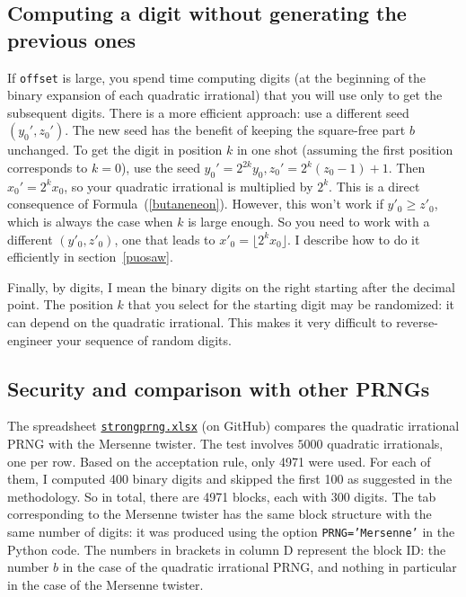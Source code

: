 \documentclass[oneside,10pt]{book}
\begin{document}
\subsection{Computing a digit without generating the previous ones}\label{imprsqrt2mnb}

If \texttt{offset} is large, you spend time computing digits (at the beginning of the binary expansion of each quadratic irrational) that you will use only   to get the subsequent digits.
 There is a more efficient approach: use a different seed $(y_0', z_0')$. The new seed has the benefit of keeping
 the square-free part $b$ unchanged. To get the digit in position $k$ in one shot (assuming the first position corresponds to $k=0$), use the
 seed $y_0'=2^{2k} y_0, z_0'=2^k(z_0-1) + 1$. Then $x_0' = 2^k x_0$, so your quadratic irrational is multiplied by $2^k$. This is a direct consequence
of Formula~(\ref{butaneneon}). However, this won't work if $y'_0 \geq z'_0$, which is always the case when $k$ is large enough.
So you need to work with a different $(y'_0, z'_0)$, one that leads to $x'_0 = \lfloor 2^k x_0 \rfloor$. I describe how to do it efficiently
in section~\ref{puosaw}.

Finally, by digits, I mean the binary digits on the right starting after the decimal point. The position $k$ that you select for the starting digit may be randomized: it can depend on the quadratic irrational. This makes it
 very difficult to reverse-engineer your sequence of random digits.

\subsection{Security and comparison with other PRNGs}

The spreadsheet \href{https://github.com/VincentGranville/Experimental-Math-Number-Theory/blob/main/Source-Code/strongprng.xlsx}{\texttt{strongprng.xlsx}} (on GitHub) compares the quadratic irrational PRNG with the
Mersenne twister. The test involves $\num{5000}$ quadratic irrationals, one per row. Based on the acceptation rule, only 4971 were used. For each of them, I computed 400 binary digits and skipped the first 100 as suggested in the
 methodology. So in total, there are 4971 blocks, each with 300 digits. The tab corresponding to the Mersenne twister has the same block structure with the same number of digits: it was produced using the option \texttt{PRNG='Mersenne'} in the Python code. The numbers in brackets in column D represent the block ID: the number $b$ in the case of the quadratic irrational PRNG, and nothing in particular in the case of the Mersenne twister.
\end{document}
